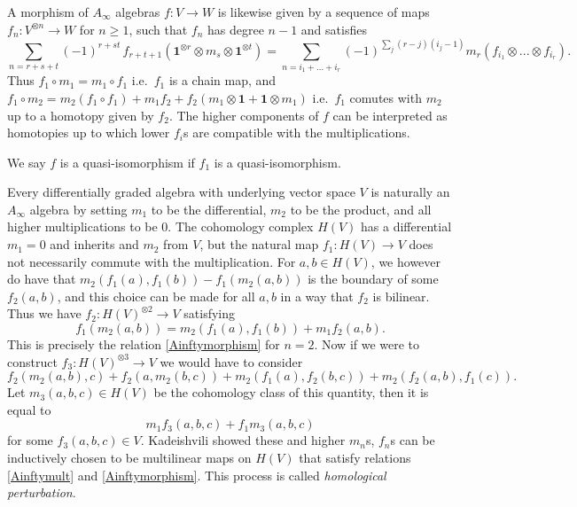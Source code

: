 A morphism of \(A_\infty\) algebras \(f:V\rightarrow W\) is likewise given by a
sequence of maps \(f_n: V^{\otimes n}\rightarrow W\) for \(n\geq 1\), such that
\(f_n\) has degree \(n-1\) and satisfies 
\begin{equation} \label{Ainftymorphism}
    \sum_{n=r+s+t}(-1)^{r+st}\,f_{r+t+1}(\mathbold{1}^{\otimes r}\otimes m_s
    \otimes \mathbold{1}^{\otimes t}) =
    \sum_{n=i_1+...+i_r}(-1)^{\sum_j(r-j)(i_j-1)}
    m_r(f_{i_1}\otimes...\otimes f_{i_r}). 
\end{equation}
Thus \(f_1\circ m_1 = m_1 \circ f_1\) i.e.\ \(f_1\) is a chain map, and
\(f_1\circ m_2 = m_2(f_1\circ f_1) + m_1f_2 + f_2(m_1\otimes \mathbold{1} +
\mathbold{1}\otimes m_1)\) i.e.\ \(f_1\) comutes with \(m_2\) up to a homotopy
given by \(f_2\). The higher components of \(f\) can be interpreted as
homotopies up to which lower \(f_i\)s are compatible with the multiplications.

We say \(f\) is a quasi-isomorphism if \(f_1\) is a quasi-isomorphism.

\begin{example}
    Every differentially graded algebra with underlying vector space \(V\) is
    naturally an \(A_\infty\) algebra by setting \(m_1\) to be the differential,
    \(m_2\) to be the product, and all higher multiplications to be \(0\). The
    cohomology complex \(H(V)\) has a differential \(m_1=0\) and inherits and
    \(m_2\) from \(V\), but the natural map \(f_1: H(V) \rightarrow V\) does not
    necessarily commute with the multiplication. For \(a,b\in H(V)\), we however
    do have that \(m_2(f_1(a),f_1(b))-f_1(m_2(a,b))\) is the boundary of some
    \(f_2(a,b)\), and this choice can be made for all \(a,b\) in a way that
    \(f_2\) is bilinear. Thus we have \(f_2: H(V)^{\otimes 2}\rightarrow V\)
    satisfying 
    \[ f_1(m_2(a,b)) =  m_2(f_1(a),f_1(b))+ m_1f_2(a,b). \]
    This is precisely the relation \eqref{Ainftymorphism} for \(n=2\). Now if we
    were to construct \(f_3:H(V)^{\otimes 3}\rightarrow V\) we would have to
    consider 
    \[f_2(m_2(a,b),c) + f_2(a,m_2(b,c)) + m_2(f_1(a), f_2(b,c)) +
    m_2(f_2(a,b), f_1(c)).\]
    Let \(m_3(a,b,c)\in H(V)\) be the cohomology class of this quantity, then it
    is equal to  \[m_1f_3(a,b,c) + f_1m_3(a,b,c)\] for some
    \(f_3(a,b,c)\in V\). Kadeishvili showed these and higher \(m_n\)s, \(f_n\)s
    can be inductively chosen to be multilinear maps on \(H(V)\) that satisfy
    relations \eqref{Ainftymult} and \eqref{Ainftymorphism}. This process is
    called \textit{homological perturbation}.
\end{example} 

